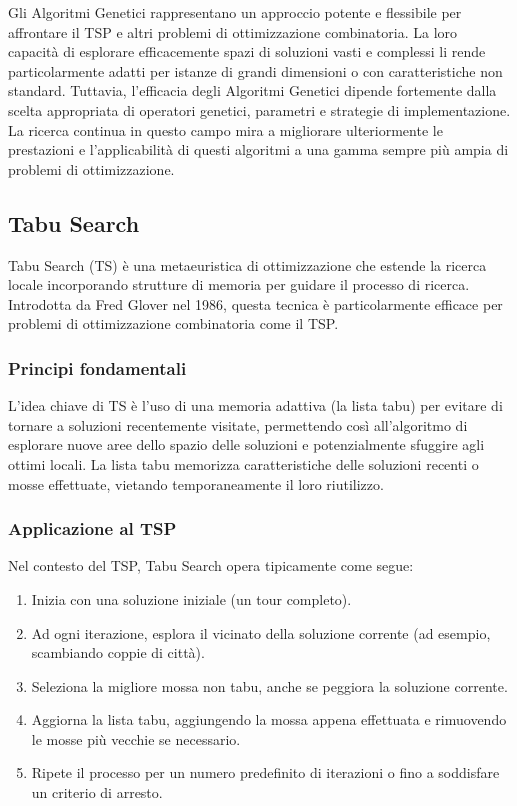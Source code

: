Gli Algoritmi Genetici rappresentano un approccio potente e flessibile per affrontare il \Gls{TSP} e altri problemi di ottimizzazione combinatoria. La loro capacità di esplorare efficacemente spazi di soluzioni vasti e complessi li rende particolarmente adatti per istanze di grandi dimensioni o con caratteristiche non standard. Tuttavia, l'efficacia degli Algoritmi Genetici dipende fortemente dalla scelta appropriata di operatori genetici, parametri e strategie di implementazione. La ricerca continua in questo campo mira a migliorare ulteriormente le prestazioni e l'applicabilità di questi algoritmi a una gamma sempre più ampia di problemi di ottimizzazione.

\subsection{Tabu Search}

Tabu Search (\Gls{TS}) è una metaeuristica di ottimizzazione che estende la ricerca locale incorporando strutture di memoria per guidare il processo di ricerca. Introdotta da Fred Glover nel 1986, questa tecnica è particolarmente efficace per problemi di ottimizzazione combinatoria come il \Gls{TSP}.

\subsubsection{Principi fondamentali}

L'idea chiave di \Gls{TS} è l'uso di una memoria adattiva (la lista tabu) per evitare di tornare a soluzioni recentemente visitate, permettendo così all'algoritmo di esplorare nuove aree dello spazio delle soluzioni e potenzialmente sfuggire agli ottimi locali. La lista tabu memorizza caratteristiche delle soluzioni recenti o mosse effettuate, vietando temporaneamente il loro riutilizzo.

\subsubsection{Applicazione al \Gls{TSP}}

Nel contesto del \Gls{TSP}, Tabu Search opera tipicamente come segue:

\begin{enumerate}
	\item Inizia con una soluzione iniziale (un tour completo).
	\item Ad ogni iterazione, esplora il vicinato della soluzione corrente (ad esempio, scambiando coppie di città).
	\item Seleziona la migliore mossa non tabu, anche se peggiora la soluzione corrente.
	\item Aggiorna la lista tabu, aggiungendo la mossa appena effettuata e rimuovendo le mosse più vecchie se necessario.
	\item Ripete il processo per un numero predefinito di iterazioni o fino a soddisfare un criterio di arresto.
\end{enumerate}

